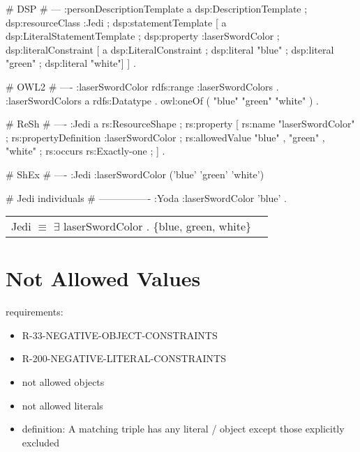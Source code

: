 \documentclass{llncs}
\newenvironment{DL}{
	\begin{center}
  \begin{tabular}{r l}

}{
  \end{tabular}
	\end{center}
}
\newcommand{\tb}[1]{\todo[size=\small, color=blue!40]{\textbf{Thomas:} #1}}
\begin{document}
\begin{ex}
# DSP
# ---
:personDescriptionTemplate
    a dsp:DescriptionTemplate ;
    dsp:resourceClass :Jedi ;
    dsp:statementTemplate [
        a dsp:LiteralStatementTemplate ;
        dsp:property :laserSwordColor ;
        dsp:literalConstraint [
            a dsp:LiteralConstraint ;
            dsp:literal "blue" ;
            dsp:literal "green" ;
            dsp:literal "white"] ] .
\end{ex}

\begin{ex}
# OWL2
# ----
:laserSwordColor rdfs:range :laserSwordColors . 
:laserSwordColors
    a rdfs:Datatype .
    owl:oneOf ( "blue" "green" "white" ) .
\end{ex}

\begin{ex}
# ReSh
# ----
:Jedi a rs:ResourceShape ;
    rs:property [
        rs:name "laserSwordColor" ;
        rs:propertyDefinition :laserSwordColor ;
        rs:allowedValue "blue" , "green" , "white" ;
        rs:occurs rs:Exactly-one ;
    ] .
\end{ex}

\begin{ex}
# ShEx
# ----
:Jedi {
    :laserSwordColor ('blue' 'green' 'white') }
\end{ex}

\begin{ex}
# Jedi individuals
# ----------------
:Yoda 
    :laserSwordColor 'blue' .
\end{ex}

\begin{DL}
Jedi $\equiv$ $\exists$ laserSwordColor . \{blue, green, white\} \\
\end{DL}


\section{Not Allowed Values}

requirements:

\begin{itemize}
	\item R-33-NEGATIVE-OBJECT-CONSTRAINTS
	\item R-200-NEGATIVE-LITERAL-CONSTRAINTS
\end{itemize}



\begin{itemize}
	\item not allowed objects
	\item not allowed literals
	\item definition: A matching triple has any literal / object except those explicitly excluded
\end{itemize}
\end{document}
